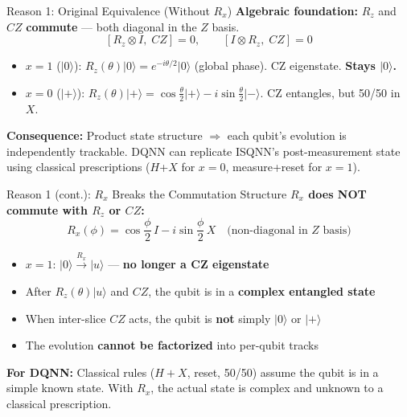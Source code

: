 \documentclass[aspectratio=169]{beamer}
\newcommand{\ket}[1]{\lvert #1\rangle}
\begin{document}
\begin{frame}{Reason 1: Original Equivalence (Without $R_x$)}
  \small
  \textbf{Algebraic foundation:} $R_z$ and $CZ$ \textbf{commute} --- both diagonal in the $Z$ basis.
  \[ [R_z\otimes I,\; CZ] = 0,\qquad [I\otimes R_z,\; CZ] = 0 \]

  \begin{itemize}
    \item $x=1$ ($\ket{0}$): $R_z(\theta)\ket{0}=e^{-i\theta/2}\ket{0}$ (global phase). CZ eigenstate. \textbf{Stays $\ket{0}$.}
    \item $x=0$ ($\ket{+}$): $R_z(\theta)\ket{+}=\cos\frac{\theta}{2}\ket{+}-i\sin\frac{\theta}{2}\ket{-}$. CZ entangles, but 50/50 in $X$.
  \end{itemize}

  \vspace{0.3em}
  \textbf{Consequence:} Product state structure $\Rightarrow$ each qubit's evolution is independently trackable. DQNN can replicate ISQNN's post-measurement state using classical prescriptions ($H$+$X$ for $x=0$, measure+reset for $x=1$).
\end{frame}

\begin{frame}{Reason 1 (cont.): $R_x$ Breaks the Commutation Structure}
  \small
  \textbf{$R_x$ does NOT commute with $R_z$ or $CZ$:}
  \[ R_x(\phi) = \cos\frac{\phi}{2}\,I - i\sin\frac{\phi}{2}\,X \quad\text{(non-diagonal in $Z$ basis)} \]

  \begin{itemize}
    \item $x=1$: $\ket{0}\xrightarrow{R_x}\ket{u}$ --- \textbf{no longer a CZ eigenstate}
    \item After $R_z(\theta)\ket{u}$ and $CZ$, the qubit is in a \textbf{complex entangled state}
    \item When inter-slice $CZ$ acts, the qubit is \textbf{not} simply $\ket{0}$ or $\ket{+}$
    \item The evolution \textbf{cannot be factorized} into per-qubit tracks
  \end{itemize}

  \vspace{0.3em}
  \textbf{For DQNN:} Classical rules ($H+X$, reset, 50/50) assume the qubit is in a simple known state. With $R_x$, the actual state is complex and unknown to a classical prescription.
\end{frame}
\end{document}
